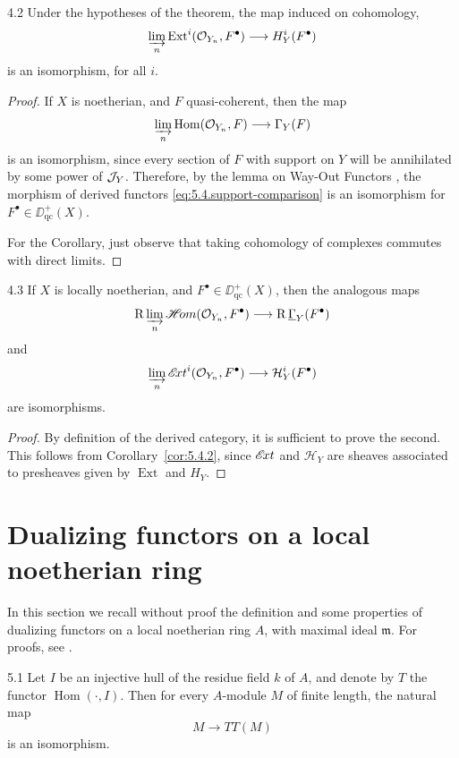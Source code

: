 \begin{bookcorollary}{4.2}\label{cor:5.4.2}
Under the hypotheses of the theorem, the map induced on cohomology,
\[
\varinjlim_n \operatorname{Ext}^{i}(\mathcal{O}_{Y_{n}}, F^{\bullet})\longrightarrow H_{Y}^{i}(F^{\bullet})
\]
is an isomorphism, for all $i$.
\end{bookcorollary}

\begin{proof}
If $X$ is noetherian, and $F$ quasi-coherent, then the map
\[
\varinjlim_n\operatorname{Hom}(\mathcal{O}_{Y_{n}}, F)\longrightarrow \Gamma_{Y}(F)
\]
is an isomorphism, since every section of $F$ with support on $Y$ will be annihilated by some power of $\mathcal{J}_Y$. Therefore, by the lemma on Way-Out Functors , the morphism of derived functors \eqref{eq:5.4.support-comparison} is an isomorphism for $F^\bullet\in\DD^+_{\mathrm{qc}}(X)$.

For the Corollary, just observe that taking cohomology of complexes commutes with direct limits.
\end{proof}

\begin{bookcorollary}{4.3}\label{cor:5.4.3}
If $X$ is locally noetherian, and $F^\bullet\in\DD^+_{\mathrm{qc}}(X)$, then the analogous maps
\[
\operatorname{R}\varinjlim_n \mathop{\mathscr{H}\!om}\nolimits(\mathcal{O}_{Y_n}, F^\bullet)\longrightarrow \operatorname{R}\underline{\Gamma}_{Y}(F^\bullet)
\]
and
\[
\varinjlim_n \mathop{\mathscr{E}\!xt}\nolimits^{i}(\mathcal{O}_{Y_{n}}, F^{\bullet})\longrightarrow \mathcal{H}_{Y}^{i}(F^{\bullet})
\]
are isomorphisms.
\end{bookcorollary}

\begin{proof}
By definition of the derived category, it is sufficient to prove the second. This follows from Corollary~\ref{cor:5.4.2}, since $\mathop{\mathscr{E}\!xt}\nolimits$ and $\mathcal{H}_{Y}$ are sheaves associated to presheaves given by $\operatorname{Ext}$ and $H_{Y}$.
\end{proof}

\section{Dualizing functors on a local noetherian ring}\label{sec:5.5}

In this section we recall without proof the definition and some properties of dualizing functors on a local noetherian ring $A$, with maximal ideal $\mathfrak{m}$. For proofs, see \cite[\nopp \S4]{LC}.

\begin{bookproposition}{5.1}\label{prop:5.5.1}
Let $I$ be an injective hull of the residue field $k$ of $A$, and denote by $T$ the functor $\operatorname{Hom}(\cdot,I)$. Then for every $A$-module $M$ of finite length, the natural map
\[
M\longrightarrow T T(M)
\]
is an isomorphism.
\end{bookproposition}

